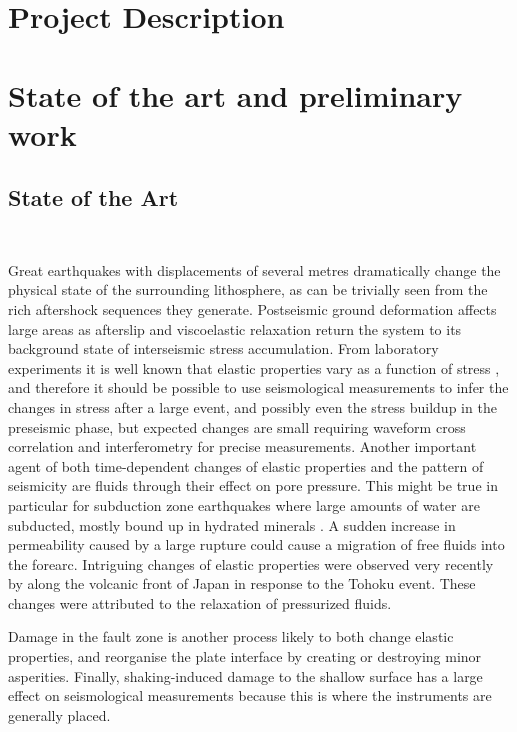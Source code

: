 \documentclass[11pt]{article}
\providecommand{\currfilename}{}
\newcommand{\showfile}{{\bf \tt \color{blue} \currfilename}}
\newcommand{\showfile}{}
\begin{document}
\clearpage

\section*{Project Description}

\section{State of the art and preliminary work}
\subsection{State of the Art}
\showfile


Great earthquakes with displacements of several metres %
dramatically change the physical state of the surrounding lithosphere, as can be trivially seen from the rich aftershock sequences they generate.
Postseismic ground deformation affects large areas as afterslip and viscoelastic relaxation return the system to its  background state of interseismic stress accumulation. From laboratory experiments it is well known that elastic properties vary as a function of stress \citep[e.g.][]{shapiroKaselow2005}, and therefore it should be possible to use seismological measurements to infer the changes in stress after a large event, and possibly even the stress buildup in the preseismic phase, but expected changes are small requiring waveform cross correlation and interferometry for precise measurements.  Another important agent of both time-dependent changes of elastic properties and the pattern of seismicity are fluids through their effect on pore pressure. This might be true in particular for subduction zone earthquakes where large amounts of water are subducted, mostly bound up in hydrated minerals \citep{hacker03b,moore01}. A sudden increase in permeability 
caused by a large rupture could cause a migration of free fluids into the forearc. Intriguing changes of elastic properties were observed very recently by \citet{Brenguier2014} along the volcanic front of Japan in response to the Tohoku event. These changes were attributed to the relaxation of pressurized fluids.

Damage in the fault zone is another process likely to both change elastic properties, and reorganise the plate interface by creating or destroying minor asperities. Finally, shaking-induced damage to the shallow surface has a large effect on seismological measurements because this is where the instruments are generally placed.
\end{document}
